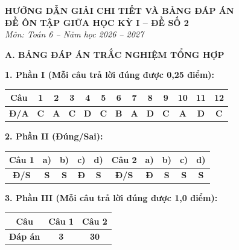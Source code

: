 \documentclass[12pt,a4paper]{article}
\begin{document}
\begin{center}
  \textbf{\Large HƯỚNG DẪN GIẢI CHI TIẾT VÀ BẢNG ĐÁP ÁN}\\
  \textbf{\large ĐỀ ÔN TẬP GIỮA HỌC KỲ I -- ĐỀ SỐ 2}\\
  \textit{Môn: Toán 6 -- Năm học 2026 -- 2027}
\end{center}
\vspace{2mm}

\noindent\textbf{\large A. BẢNG ĐÁP ÁN TRẮC NGHIỆM TỔNG HỢP}
\vspace{1.5mm}

\noindent\textbf{1. Phần I (Mỗi câu trả lời đúng được 0,25 điểm):}
\begin{center}
\begin{tabular}{|c|c|c|c|c|c|c|c|c|c|c|c|c|}
\hline
\textbf{Câu} & \textbf{1} & \textbf{2} & \textbf{3} & \textbf{4} & \textbf{5} & \textbf{6} & \textbf{7} & \textbf{8} & \textbf{9} & \textbf{10} & \textbf{11} & \textbf{12} \\
\hline
\textbf{Đ/A} & \textbf{C} & \textbf{A} & \textbf{C} & \textbf{D} & \textbf{C} & \textbf{B} & \textbf{A} & \textbf{D} & \textbf{C} & \textbf{A} & \textbf{D} & \textbf{C} \\
\hline
\end{tabular}
\end{center}
\vspace{1mm}

\noindent\textbf{2. Phần II (Đúng/Sai):}
\begin{center}
\begin{tabular}{|c|c|c|c|c||c|c|c|c|c|}
\hline
\textbf{Câu 1} & \textbf{a)} & \textbf{b)} & \textbf{c)} & \textbf{d)} & \textbf{Câu 2} & \textbf{a)} & \textbf{b)} & \textbf{c)} & \textbf{d)} \\
\hline
\textbf{Đ/S} & \textbf{S} & \textbf{S} & \textbf{Đ} & \textbf{S} & \textbf{Đ/S} & \textbf{Đ} & \textbf{S} & \textbf{S} & \textbf{S} \\
\hline
\end{tabular}
\end{center}
\vspace{1mm}

\noindent\textbf{3. Phần III (Mỗi câu trả lời đúng được 1,0 điểm):}
\begin{center}
\begin{tabular}{|c|c|c|}
\hline
\textbf{Câu} & \textbf{Câu 1} & \textbf{Câu 2} \\
\hline
\textbf{Đáp án} & \textbf{3} & \textbf{30} \\
\hline
\end{tabular}
\end{center}
\vspace{3mm}
\end{document}
